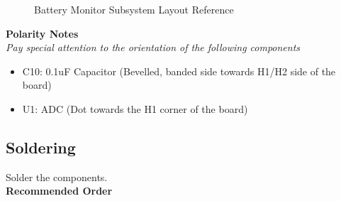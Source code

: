 \documentclass{article}
\begin{document}
\begin{figure}[H]
    \centering
        \qquad
        \caption{Battery Monitor Subsystem Layout Reference}%
    \label{fig:batt-mon-layout}%
\end{figure}

\noindent \textbf{Polarity Notes}\\
\noindent \textit{Pay special attention to the orientation of the following components}
\begin{itemize}
  \item C10: 0.1uF Capacitor (Bevelled, banded side towards H1/H2 side of the board)
  \item U1: ADC (Dot towards the H1 corner of the board)
\end{itemize}

\subsection{Soldering}

Solder the components. \\

\noindent \textbf{Recommended Order}
\end{document}
